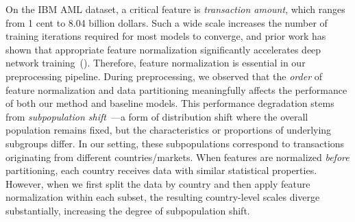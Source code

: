 \documentclass[11pt,english]{article}
\newcommand{\lc}[1]{{\textsf{\textcolor{blue}{[LC: #1]}}}}
\begin{document}
On the IBM AML dataset, a critical feature is \emph{transaction amount}, which ranges from 1 cent to 8.04 billion dollars. Such a wide scale increases the number of training iterations required for most models to converge, and prior work has shown that appropriate feature normalization significantly accelerates deep network training~(\cite{ioffe2015batch}). Therefore, feature normalization is essential in our preprocessing pipeline. During preprocessing, we observed that the \emph{order} of feature normalization and data partitioning meaningfully affects the performance of both our method and baseline models. This performance degradation stems from \emph{subpopulation shift}~\parencite{koh2021wilds}---a form of distribution shift where the overall population remains fixed, but the characteristics or proportions of underlying subgroups differ. In our setting, these subpopulations correspond to transactions originating from different countries/markets. When features are normalized \emph{before} partitioning, each country receives data with similar statistical properties. However, when we first split the data by country and then apply feature normalization within each subset, the resulting country-level scales diverge substantially, increasing the degree of subpopulation shift.
\end{document}
